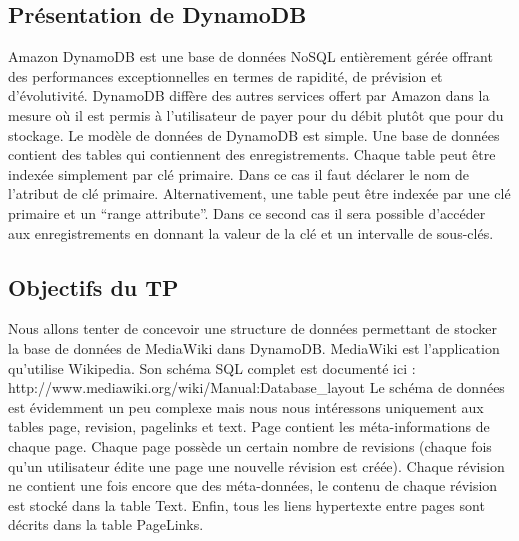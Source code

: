 \subsection{Présentation de DynamoDB}
Amazon DynamoDB est une base de données NoSQL entièrement gérée offrant des performances exceptionnelles en termes de rapidité, de prévision et d'évolutivité. DynamoDB diffère des autres services offert par Amazon dans la mesure où il est permis à l'utilisateur de payer pour du débit plutôt que pour du stockage.
Le modèle de données de DynamoDB est simple. Une base de données contient des tables qui contiennent des enregistrements. Chaque table peut être indexée simplement par clé primaire. Dans ce cas il faut déclarer le nom de l’atribut de clé primaire. Alternativement, une table peut être indexée par une clé primaire et un “range attribute”. Dans ce second cas il sera possible d’accéder aux enregistrements en donnant la valeur de la clé et un intervalle de sous-clés.

\subsection{Objectifs du TP}
Nous allons tenter de concevoir une structure de données permettant de stocker la base de données de MediaWiki dans DynamoDB. MediaWiki est l’application qu’utilise Wikipedia. Son schéma SQL complet est documenté ici : http://www.mediawiki.org/wiki/Manual:Database_layout
Le schéma de données est évidemment un peu complexe mais nous nous intéressons uniquement aux tables page, revision, pagelinks et text. Page contient les méta-informations de chaque page. Chaque page possède un certain nombre de revisions (chaque fois qu’un utilisateur édite une page une nouvelle révision est créée). Chaque révision ne contient une fois encore que des méta-données, le contenu de chaque révision est stocké dans la table Text. Enﬁn, tous les liens hypertexte entre pages sont décrits dans la table PageLinks.